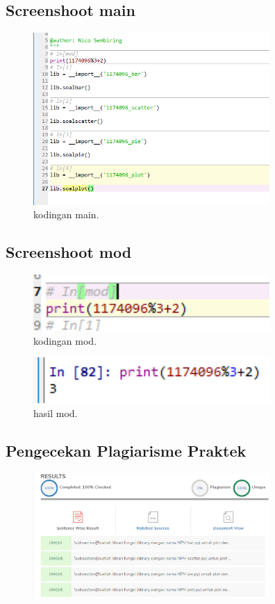 \subsection{Screenshoot main}
\begin{figure}[H]
	\includegraphics[width=9cm]{figures/6/Praktek/1174096/kodinganmain.png}
	\caption{kodingan main.}
	\centering
\end{figure}

\subsection{Screenshoot mod}
\begin{figure}[H]
	\includegraphics[width=9cm]{figures/6/Praktek/1174096/kodingmod.png}
	\caption{kodingan mod.}
	\centering
\end{figure}

\begin{figure}[H]
	\includegraphics[width=9cm]{figures/6/Praktek/1174096/hasilmod.png}
	\caption{hasil mod.}
	\centering
\end{figure}

\subsection{Pengecekan Plagiarisme Praktek}
\begin{figure}[H]
	\includegraphics[width=9cm]{figures/6/Praktek/1174096/Plagiatpraktek.png}
	\centering
\end{figure}

